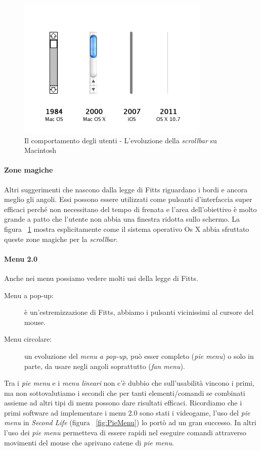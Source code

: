 					\begin{figure} [h]
						\centering
						\includegraphics[scale=0.8]{images/IlComportamentoDegliUtenti-InterfacceEFitts}
						\caption[Il comportamento degli utenti - Evoluzione \emph{scrollbar} su Mac]{Il comportamento degli utenti - L'evoluzione della \emph{scrollbar} su Macintosh}
						\label{fig:InterfacceEFitts}
					\end{figure}
				
				\paragraph{Zone magiche}
					Altri suggerimenti che nascono dalla legge di Fitts riguardano i bordi e ancora meglio gli angoli. Essi possono essere utilizzati come pulsanti d'interfaccia super efficaci perché non necessitano del tempo di frenata e l'area dell'obiettivo è molto grande a patto che l'utente non abbia una finestra ridotta sullo schermo. La figura ~\ref{fig:InterfacceEFitts} mostra esplicitamente come il sistema operativo Os X abbia sfruttato queste zone magiche per la \emph{scrollbar}. 
				
				\paragraph{Menu 2.0}
					Anche nei menu possiamo vedere molti usi della legge di Fitts.
					\begin{description}
						\item[Menu a pop-up:] è un'estremizzazione di Fitts, abbiamo i pulsanti vicinissimi al cursore del mouse.
						\item[Menu circolare:] un evoluzione del \emph{menu a pop-up}, può esser completo (\emph{pie menu}) o solo in parte, da usare negli angoli soprattutto (\emph{fan menu}).
					\end{description}
					Tra i \emph{pie menu} e i \emph{menu lineari} non c'è dubbio che sull'usabilità vincono i primi, ma non sottovalutiamo i secondi che  per tanti elementi/comandi se combinati assieme ad altri tipi di menu possono dare risultati efficaci.
					Ricordiamo che i primi software ad implementare i menu 2.0 sono stati i videogame, l'uso del \emph{pie menu} in \emph{Second Life} (figura ~\ref{fig:PieMenu}) lo portò ad un gran successo. In altri l'uso dei \emph{pie menu} permetteva di essere rapidi nel eseguire comandi attraverso movimenti del mouse che aprivano catene di \emph{pie menu}.
				
